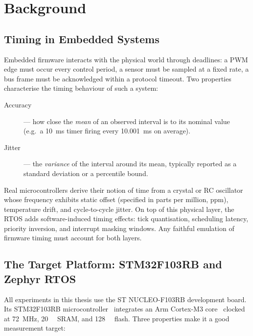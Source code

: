 \chapter{Background}
\label{ch:background}

\section{Timing in Embedded Systems}
\label{sec:bg:timing}

Embedded firmware interacts with the physical world through deadlines:
a PWM edge must occur every control period, a sensor must be sampled at
a fixed rate, a bus frame must be acknowledged within a protocol
timeout. Two properties characterise the timing behaviour of such a
system:

\begin{description}
  \item[Accuracy] --- how close the \emph{mean} of an observed interval
        is to its nominal value (e.g.\ a \SI{10}{\milli\second} timer
        firing every \SI{10.001}{\milli\second} on average).
  \item[Jitter] --- the \emph{variance} of the interval around its
        mean, typically reported as a standard deviation or a
        percentile bound.
\end{description}

Real microcontrollers derive their notion of time from a crystal or RC
oscillator whose frequency exhibits static offset (specified in parts
per million, ppm), temperature drift, and cycle-to-cycle jitter. On top
of this physical layer, the RTOS adds software-induced timing effects:
tick quantisation, scheduling latency, priority inversion, and
interrupt masking windows. Any faithful emulation of firmware timing
must account for both layers.

\section{The Target Platform: STM32F103RB and Zephyr RTOS}
\label{sec:bg:platform}

All experiments in this thesis use the ST NUCLEO-F103RB development
board. Its STM32F103RB microcontroller~\cite{stm32rm0008} integrates an
Arm Cortex-M3 core~\cite{armcm3trm} clocked at \SI{72}{\mega\hertz},
\SI{20}{\kilo\byte} SRAM, and \SI{128}{\kilo\byte} flash. Three
properties make it a good measurement target:

